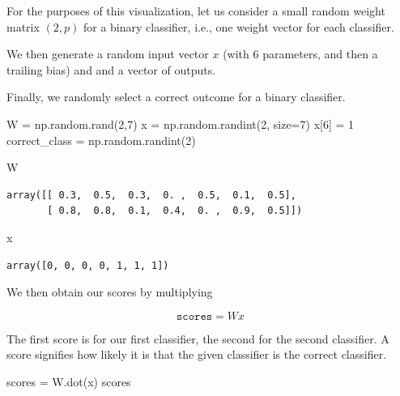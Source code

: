 \documentclass[]{report}
\newenvironment{Shaded}{}{}
\newcommand{\DecValTok}[1]{\textcolor[rgb]{0.25,0.63,0.44}{{#1}}}
\newcommand{\OperatorTok}[1]{\textcolor[rgb]{0.40,0.40,0.40}{{#1}}}
\newcommand{\NormalTok}[1]{{#1}}
\begin{document}
For the purposes of this visualization, let us consider a small random
weight matrix \((2,p)\) for a binary classifier, i.e., one weight vector
for each classifier.

We then generate a random input vector \(x\) (with 6 parameters, and
then a trailing bias) and and a vector of outputs.

Finally, we randomly select a correct outcome for a binary classifier.

\begin{Shaded}
\begin{Highlighting}[]
\NormalTok{W }\OperatorTok{=} \NormalTok{np.random.rand(}\DecValTok{2}\NormalTok{,}\DecValTok{7}\NormalTok{)}
\NormalTok{x }\OperatorTok{=} \NormalTok{np.random.randint(}\DecValTok{2}\NormalTok{, size}\OperatorTok{=}\DecValTok{7}\NormalTok{)}
\NormalTok{x[}\DecValTok{6}\NormalTok{] }\OperatorTok{=} \DecValTok{1}
\NormalTok{correct_class }\OperatorTok{=} \NormalTok{np.random.randint(}\DecValTok{2}\NormalTok{)}
\end{Highlighting}
\end{Shaded}

\begin{Shaded}
\begin{Highlighting}[]
\NormalTok{W}
\end{Highlighting}
\end{Shaded}

\begin{verbatim}
array([[ 0.3,  0.5,  0.3,  0. ,  0.5,  0.1,  0.5],
       [ 0.8,  0.8,  0.1,  0.4,  0. ,  0.9,  0.5]])
\end{verbatim}

\begin{Shaded}
\begin{Highlighting}[]
\NormalTok{x}
\end{Highlighting}
\end{Shaded}

\begin{verbatim}
array([0, 0, 0, 0, 1, 1, 1])
\end{verbatim}

We then obtain our scores by multiplying

\[\texttt{scores}=Wx\]

The first score is for our first classifier, the second for the second
classifier. A score signifies how likely it is that the given classifier
is the correct classifier.

\begin{Shaded}
\begin{Highlighting}[]
\NormalTok{scores }\OperatorTok{=} \NormalTok{W.dot(x)}
\NormalTok{scores}
\end{Highlighting}
\end{Shaded}
\end{document}

